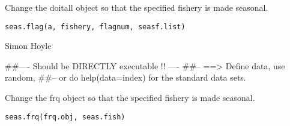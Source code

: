 \documentclass[a4paper]{book}
\begin{document}
%
\begin{Description}\relax

Change the doitall object so that the specified fishery is made seasonal. 
\end{Description}
%
\begin{Usage}
\begin{verbatim}
seas.flag(a, fishery, flagnum, seasf.list)
\end{verbatim}
\end{Usage}
%
\begin{Arguments}
\begin{ldescription}
\item[\code{a}] 


\item[\code{fishery}] 


\item[\code{flagnum}] 


\item[\code{seasf.list}] 


\end{ldescription}
\end{Arguments}
%
\begin{Author}\relax

Simon Hoyle
\end{Author}
%
\begin{Examples}
\begin{ExampleCode}
##---- Should be DIRECTLY executable !! ----
##-- ==>  Define data, use random,
##--	or do  help(data=index)  for the standard data sets.

\end{ExampleCode}
\end{Examples}
%
\begin{Description}\relax

Change the frq object so that the specified fishery is made seasonal. 
\end{Description}
%
\begin{Usage}
\begin{verbatim}
seas.frq(frq.obj, seas.fish)
\end{verbatim}
\end{Usage}
%
\begin{Arguments}
\begin{ldescription}
\item[\code{frq.obj}] 


\item[\code{seas.fish}] 


\end{ldescription}
\end{Arguments}
\end{document}

